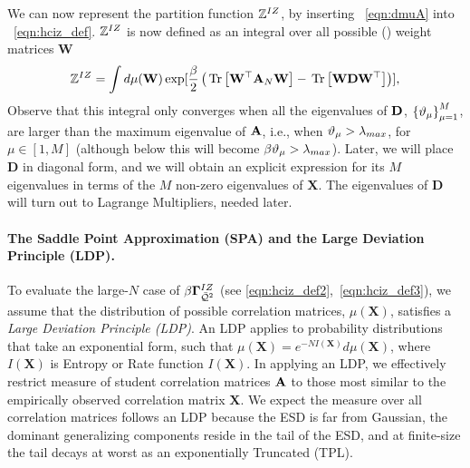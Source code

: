 We can now represent the partition function
$\mathbb{Z}^{IZ}$, by inserting \EQN~\ref{eqn:dmuA} into \EQN~\ref{eqn:hciz_def}.
$\mathbb{Z}^{IZ}$ is now defined as an integral over all
possible (\Teacher) weight matrices $\mathbf{W}$
\begin{equation}
  \label{eqn:ZD0}
    \mathbb{Z}^{IZ}=\int d\mu(\mathbf{W})\exp[\frac{\beta}{2}\left
    (\mbox{}\operatorname{Tr}\left[\mathbf{W}^{\top}\mathbf{A}_N\mathbf{W}\right]-\mbox{}\operatorname{Tr}\left[\mathbf{W}\mathbf{D}\mathbf{W}^{\top}\right]  
    \right)]  ,
\end{equation}
Observe that this integral only converges when all the eigenvalues of $\mathbf{D}$, 
$\left\{ \vartheta_{\mu} \right\}_{\mu=1}^{M}$, 
are larger than the maximum eigenvalue of $\mathbf{\mathbf{A}}$, i.e., when $\vartheta_{\mu} >\lambda_{max}$, for $\mu\in[1,M]$
(although below this will become $\beta\vartheta_{\mu} >\lambda_{max}$).
Later, we will place $\mathbf{D}$ in diagonal form, and we will obtain an explicit expression for its $M$ eigenvalues in terms of the $M$ non-zero eigenvalues of $\mathbf{X}$.
The eigenvalues of $\mathbf{D}$ will turn out to Lagrange Multipliers, needed later.


\paragraph{The Saddle Point Approximation (SPA) and the Large Deviation Principle (LDP).}

To evaluate the large-$N$ case of $\beta\mathbf{\Gamma}^{IZ}_{\bar{\mathcal{Q}}^{2}}$ (see \ref{eqn:hciz_def2},~\ref{eqn:hciz_def3}), 
we assume that the distribution of possible \Teacher correlation matrices,
$\mu(\mathbf{X})$, satisfies a \emph{Large Deviation Principle (LDP)}.
An LDP applies to probability distributions that take an exponential form,
such that $\mu(\mathbf{X})=e^{-N I(\mathbf{X})}d\mu(\mathbf{X})$,
where  $I(\mathbf{X})$ is Entropy or Rate function $I(\mathbf{X})$.
In applying an LDP, we effectively restrict measure of student correlation matrices $\mathbf{\mathbf{A}}$
to those most similar to the empirically observed \Teacher correlation matrix $\mathbf{X}$.
%
We expect the measure over all \Teacher correlation matrices
follows an LDP because the ESD is far from Gaussian,
the dominant generalizing components reside in the tail of the ESD,
and at finite-size the tail decays at worst as an exponentially
Truncated \PowerLaw (TPL).

